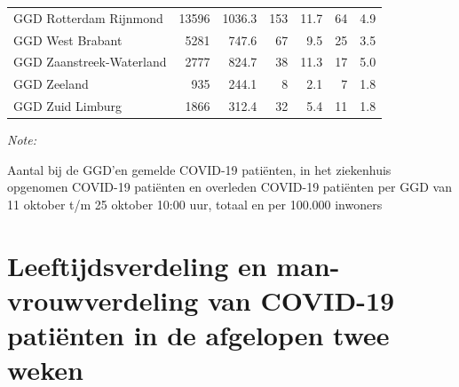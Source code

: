 \documentclass[
  english,
  man,floatsintext]{apa6}
\begin{document}
\begin{table}[H]
\begin{threeparttable}
\begin{tabular}{lrrrrrr}
GGD Rotterdam Rijnmond & 13596 & 1036.3 & 153 & 11.7 & 64 & 4.9\\
GGD West Brabant & 5281 & 747.6 & 67 & 9.5 & 25 & 3.5\\
GGD Zaanstreek-Waterland & 2777 & 824.7 & 38 & 11.3 & 17 & 5.0\\
GGD Zeeland & 935 & 244.1 & 8 & 2.1 & 7 & 1.8\\
GGD Zuid Limburg & 1866 & 312.4 & 32 & 5.4 & 11 & 1.8\\
\bottomrule
\end{tabular}
\begin{tablenotes}
\item \textit{Note: } 
\item Aantal bij de GGD’en gemelde COVID-19 patiënten, in het ziekenhuis opgenomen COVID-19 patiënten en overleden COVID-19 patiënten per GGD van 11 oktober t/m 25 oktober 10:00 uur, totaal en per 100.000 inwoners
\end{tablenotes}
\end{threeparttable}
\endgroup{}
\end{table}

\newpage

\hypertarget{leeftijdsverdeling-en-man-vrouwverdeling-van-covid-19-patiuxebnten-in-de-afgelopen-twee-weken}{%
\section{Leeftijdsverdeling en man-vrouwverdeling van COVID-19 patiënten in de afgelopen twee weken}\label{leeftijdsverdeling-en-man-vrouwverdeling-van-covid-19-patiuxebnten-in-de-afgelopen-twee-weken}}
\end{document}
